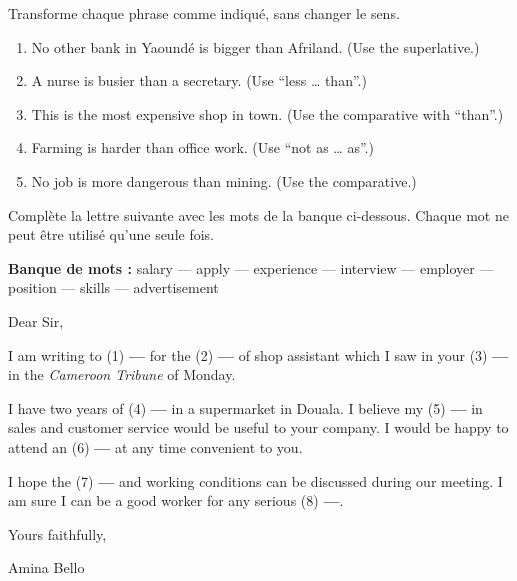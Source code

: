 \documentclass[11pt]{article}
\begin{document}
\begin{exercice}
Transforme chaque phrase comme indiqué, sans changer le sens.
\begin{enumerate}
\item No other bank in Yaoundé is bigger than Afriland. (Use the superlative.)
\item A nurse is busier than a secretary. (Use “less … than”.)
\item This is the most expensive shop in town. (Use the comparative with “than”.)
\item Farming is harder than office work. (Use “not as … as”.)
\item No job is more dangerous than mining. (Use the comparative.)
\end{enumerate}
\end{exercice}

\begin{exercice}
Complète la lettre suivante avec les mots de la banque ci-dessous. Chaque mot ne peut être utilisé qu'une seule fois.

\textbf{Banque de mots :} salary — apply — experience — interview — employer — position — skills — advertisement

\begin{textebox}
Dear Sir,

I am writing to (1) \textbf{---} for the (2) \textbf{---} of shop assistant which I saw in your (3) \textbf{---} in the \emph{Cameroon Tribune} of Monday.

I have two years of (4) \textbf{---} in a supermarket in Douala. I believe my (5) \textbf{---} in sales and customer service would be useful to your company. I would be happy to attend an (6) \textbf{---} at any time convenient to you.

I hope the (7) \textbf{---} and working conditions can be discussed during our meeting. I am sure I can be a good worker for any serious (8) \textbf{---}.

Yours faithfully,

Amina Bello
\end{textebox}
\end{exercice}
\end{document}

